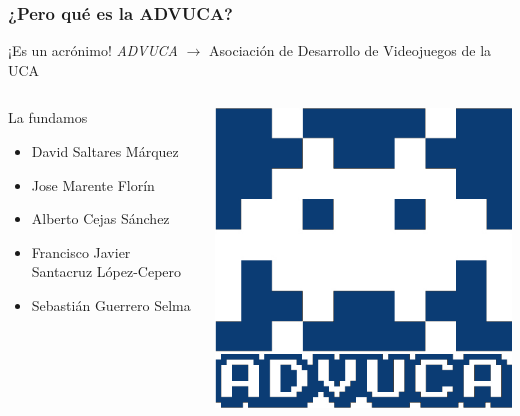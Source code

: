 \documentclass{beamer}
\begin{document}
\begin{frame}
    \frametitle{¿Pero qué es la ADVUCA?}
    
    \begin{center}
        \begin{alertblock}{¡Es un acrónimo!}
            \emph{ADVUCA} $\rightarrow$ Asociación de Desarrollo de Videojuegos de la UCA
        \end{alertblock}        
    \end{center}
    
    \begin{columns}[c]
		\column{150pt}
		\begin{block}{La fundamos}
            \begin{itemize}
                \item David Saltares Márquez
                \item Jose Marente Florín
                \item Alberto Cejas Sánchez
                \item Francisco Javier Santacruz López-Cepero
                \item Sebastián Guerrero Selma
            \end{itemize}            
        \end{block}        
		\column{150pt}
		\begin{center}
			\includegraphics[scale=0.2]{img/advuca.png}
		\end{center}
	\end{columns} 
\end{frame}
\end{document}
